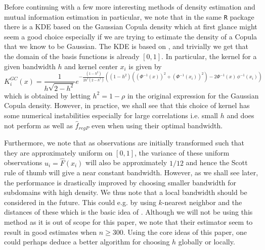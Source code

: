 \documentclass[../Thesis.tex]{subfiles}
\begin{document}
Before continuing with a few more interesting methods of density estimation and mutual information estimation in particular, we note that in the same \texttt{R} package there is a KDE based on the Gaussian Copula density which at first glance might seem a good choice especially if we are trying to estimate the density of a Copula that we know to be Gaussian. The KDE is based on \cite{Kernel-Type-Density-Estimation-on-the-Unit-Interval}, and trivially we get that the domain of the basis functions is already $[0,1]$. In particular, the kernel for a given bandwidth $h$ and kernel center $x_i$ is given by
$$K^{GC}_i \left(x\right) = \frac{1}{h \sqrt{2-h^2}} e^{-\frac{\left(1 - h^2\right)}{2 h^2 \left(2-h^2\right)} \left( \left(1 - h^2\right) \left(\left(\Phi^{-1} \left(x\right)\right)^2 + \left(\Phi^{-1} \left(x_i\right)\right)^2 \right) - 2 \Phi^{-1} \left(x\right) \, \phi^{-1}\left(x_i\right) \right) }$$
which is obtained by letting $h^2 = 1-\rho$ in the original expression for the Gaussian Copula density. However, in practice, we shall see that this choice of kernel has some numerical instabilities especially for large correlations i.e. small $h$ and does not perform as well as $\hat{f}_{regP}$ even when using their optimal bandwidth.

Furthermore, we note that as observations are initially transformed such that they are approximately uniform on $[0,1]$, the variance of these uniform observations $u_i = \hat{F}\left(x_i\right)$ will also be approximately $1/12$ and hence the Scott rule of thumb will give a near constant bandwidth. However, as we shall see later, the performance is drastically improved by choosing smaller bandwidth for subdomains with high density. We thus note that a local bandwidth should be considered in the future. This could e.g. by using $k$-nearest neighbor and the distances of these which is the basic idea of \cite{Estimating-mutual-information-Kraskov}. Although we will not be using this method as it is out of scope for this paper, we note that their estimator seem to result in good estimates when $n \geq 300$. Using the core ideas of this paper, one could perhaps deduce a better algorithm for choosing $h$ globally or locally.
\end{document}
